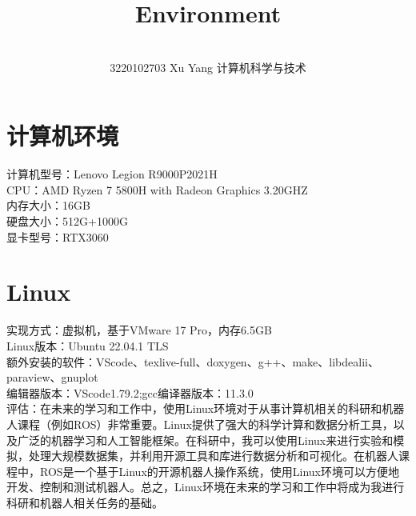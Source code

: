 \documentclass{ctexart}
\title{Environment}
\author{ \\ 3220102703 Xu Yang 计算机科学与技术}
\begin{document}
\maketitle


\section{计算机环境}
计算机型号：Lenovo Legion R9000P2021H\\
CPU：AMD Ryzen 7 5800H with Radeon Graphics 3.20GHZ\\
内存大小：16GB\\
硬盘大小：512G+1000G\\
显卡型号：RTX3060\\
\section{Linux}
实现方式：虚拟机，基于VMware 17 Pro，内存6.5GB\\
Linux版本：Ubuntu 22.04.1 TLS\\
额外安装的软件：VScode、texlive-full、doxygen、g++、make、libdealii、paraview、gnuplot\\
编辑器版本：VScode1.79.2;gcc编译器版本：11.3.0\\
评估：在未来的学习和工作中，使用Linux环境对于从事计算机相关的科研和机器人课程（例如ROS）非常重要。Linux提供了强大的科学计算和数据分析工具，以及广泛的机器学习和人工智能框架。在科研中，我可以使用Linux来进行实验和模拟，处理大规模数据集，并利用开源工具和库进行数据分析和可视化。在机器人课程中，ROS是一个基于Linux的开源机器人操作系统，使用Linux环境可以方便地开发、控制和测试机器人。总之，Linux环境在未来的学习和工作中将成为我进行科研和机器人相关任务的基础。
\end{document}
